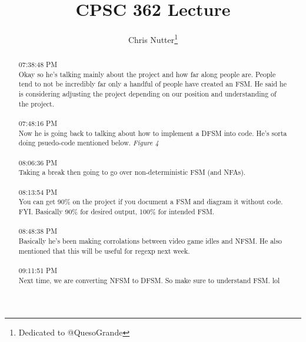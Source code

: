 \documentclass[12pt,a4paper]{article}
\title{CPSC 362 Lecture}
\author{Chris Nutter\thanks{Dedicated to @QuesoGrande}}
\begin{document}
\maketitle

\begin{abstract}
    {07:38:48 PM}\\
    Okay so he's talking mainly about the project and how far along people are. 
    People tend to not be incredibly far only a handful of people have created an FSM. 
    He said he is considering adjusting the project depending on our 
    position and understanding of the project.
        \\\\
    07:48:16 PM\\
    Now he is going back to talking about how to implement a DFSM into code. 
    He's sorta doing psuedo-code mentioned below. \emph{Figure 4}
        \\\\
    08:06:36 PM\\
    Taking a break then going to go over non-deterministic FSM (and NFAs).
        \\\\
    08:13:54 PM\\
    You can get 90\% on the project if you document a FSM and diagram it without code. FYI. 
    Basically 90\% for desired output, 100\% for intended FSM.
        \\\\
    08:48:38 PM\\
    Basically he's been making corrolations between video game idles and NFSM. He also mentioned 
    that this will be useful for regexp next week.
        \\\\
    09:11:51 PM\\
    Next time, we are converting NFSM to DFSM. So make sure to understand FSM. lol
\end{abstract}    

\clearpage
\tableofcontents
\clearpage
\end{document}
